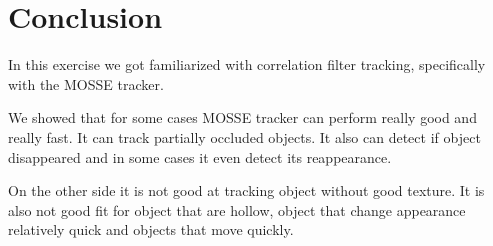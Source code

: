 \documentclass[runningheads]{llncs}
\begin{document}
\section{Conclusion}
In this exercise we got familiarized with correlation filter tracking, specifically with the MOSSE tracker.

We showed that for some cases MOSSE tracker can perform really good and really fast. It can track partially occluded objects. It also can detect if object disappeared and in some cases it even detect its reappearance.

On the other side it is not good at tracking object without good texture. It is also not good fit for object that are hollow, object that change appearance relatively quick and objects that move quickly.
\end{document}
